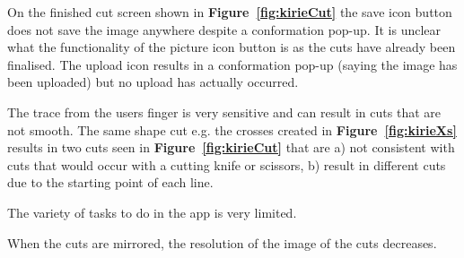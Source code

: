 \documentclass[11pt]{article}
\begin{document}
                On the finished cut screen shown in \textbf{Figure~\ref{fig:kirieCut}} the save icon button does not save the image anywhere despite a conformation pop-up. It is unclear what the functionality of the picture icon button is as the cuts have already been finalised. The upload icon results in a conformation pop-up (saying the image has been uploaded) but no upload has actually occurred. 
                
                The trace from the users finger is very sensitive and can result in cuts that are not smooth. The same shape cut e.g. the crosses created in \textbf{Figure~\ref{fig:kirieXs}} results in two cuts seen in \textbf{Figure~\ref{fig:kirieCut}} that are a) not consistent with cuts that would occur with a cutting knife or scissors, b) result in different cuts due to the starting point of each line. 
                
                The variety of tasks to do in the app is very limited.
                
                When the cuts are mirrored, the resolution of the image of the cuts decreases.
                
\end{document}
